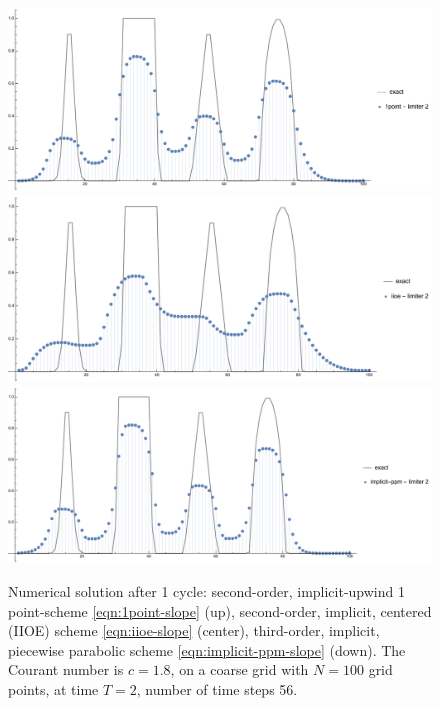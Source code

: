 \documentclass[../thesis.tex]{subfiles}
\begin{document}
\begin{figure}[H]
	\centering
	\includegraphics[width=\textwidth]{fig-1point-c1p8-T2-limit2-shu.pdf}
	\includegraphics[width=\textwidth]{fig-iioe-c1p8-T2-limit2-shu.pdf}
	\includegraphics[width=\textwidth]{fig-implicit-ppm-c1p8-T2-limit2-shu.pdf}
	\caption{Numerical solution after 1 cycle: second-order, implicit-upwind 1 point-scheme \eqref{eqn:1point-slope} (up), second-order, implicit, centered (IIOE) scheme \eqref{eqn:iioe-slope} (center), third-order, implicit, piecewise parabolic scheme \eqref{eqn:implicit-ppm-slope} (down). The Courant number is \(c = 1.8\), on a coarse grid with \(N = 100\) grid points, at time \(T = 2\), number of time steps 56.}
	\label{fig:c1p8-T2-limit2-shu}
\end{figure}
\end{document}
